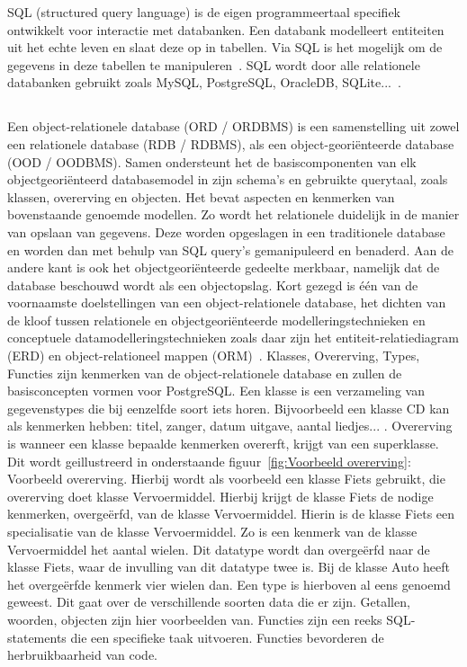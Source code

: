 SQL (structured query language) is de eigen programmeertaal specifiek ontwikkelt voor interactie met databanken. Een databank modelleert entiteiten uit het echte leven en slaat deze op in tabellen. Via SQL is het mogelijk om de gegevens in deze tabellen te manipuleren~\autocite{Carchedi2020}. SQL wordt door alle relationele databanken gebruikt zoals MySQL, PostgreSQL, OracleDB, SQLite...~\autocite{Codecademy}. 

\subsection{}
\label{subsec:Object-relationele databank}

Een object-relationele database (ORD / ORDBMS) is een samenstelling uit zowel een relationele database (RDB / RDBMS), als een object-georiënteerde database (OOD / OODBMS). Samen ondersteunt het de basiscomponenten van elk objectgeoriënteerd databasemodel in zijn schema's en gebruikte querytaal, zoals klassen, overerving en objecten. Het bevat aspecten en kenmerken van bovenstaande genoemde modellen. Zo wordt het relationele duidelijk in de manier van opslaan van gegevens. Deze worden opgeslagen in een traditionele database en worden dan met behulp van SQL query's gemanipuleerd en benaderd. Aan de andere kant is ook het objectgeoriënteerde gedeelte merkbaar, namelijk dat de database beschouwd wordt als een objectopslag. Kort gezegd is één van de voornaamste doelstellingen van een object-relationele database, het dichten van de kloof tussen relationele en objectgeoriënteerde modelleringstechnieken en conceptuele datamodelleringstechnieken zoals daar zijn het entiteit-relatiediagram (ERD) en object-relationeel mappen (ORM)~\autocite{Technopedia2021}. %
Klasses, Overerving, Types, Functies zijn kenmerken van de object-relationele database en zullen de basisconcepten vormen voor PostgreSQL. Een klasse is een verzameling van gegevenstypes die bij eenzelfde soort iets horen. Bijvoorbeeld een klasse CD kan als kenmerken hebben: titel, zanger, datum uitgave, aantal liedjes... . Overerving is wanneer een klasse bepaalde kenmerken overerft, krijgt van een superklasse. Dit wordt geillustreerd in onderstaande figuur~\ref{fig:Voorbeeld overerving}: Voorbeeld overerving. Hierbij wordt als voorbeeld een klasse Fiets gebruikt, die overerving doet klasse Vervoermiddel. Hierbij krijgt de klasse Fiets de nodige kenmerken, overgeërfd, van de klasse Vervoermiddel. Hierin is de klasse Fiets een specialisatie van de klasse Vervoermiddel. Zo is een kenmerk van de klasse Vervoermiddel het aantal wielen. Dit datatype wordt dan overgeërfd naar de klasse Fiets, waar de invulling van dit datatype twee is. Bij de klasse Auto heeft het overgeërfde kenmerk vier wielen dan. Een type is hierboven al eens genoemd geweest. Dit gaat over de verschillende soorten data die er zijn. Getallen, woorden, objecten zijn hier voorbeelden van. Functies zijn een reeks SQL-statements die een specifieke taak uitvoeren. Functies bevorderen de herbruikbaarheid van code.


